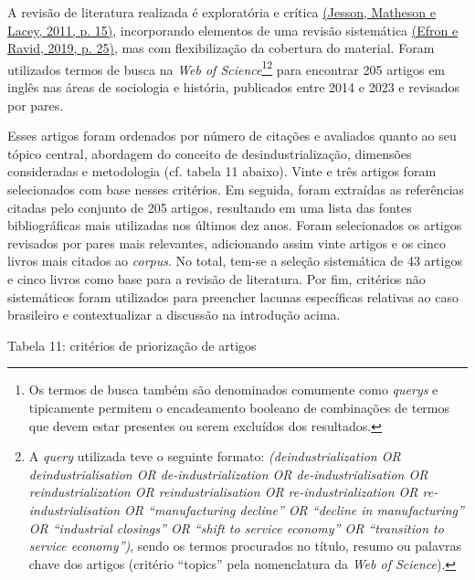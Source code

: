 A revisão de literatura realizada é exploratória e crítica
\href{https://www.zotero.org/google-docs/?2AtMYd}{(Jesson, Matheson e
Lacey, 2011, p. 15)}, incorporando elementos de uma revisão sistemática
\href{https://www.zotero.org/google-docs/?WshOkn}{(Efron e Ravid, 2019,
p. 25)}, mas com flexibilização da cobertura do material. Foram
utilizados termos de busca na \emph{Web of
Science}\footnote{Os termos de busca também são denominados comumente
  como \emph{querys} e tipicamente permitem o encadeamento booleano de
  combinações de termos que devem estar presentes ou serem excluídos dos
  resultados.}\footnote{A \emph{query} utilizada teve o seguinte
  formato: \emph{(deindustrialization OR deindustrialisation OR
  de-industrialization OR de-industrialisation OR reindustrialization OR
  reindustrialisation OR re-industrialization OR re-industrialisation OR
  ``manufacturing decline'' OR ``decline in manufacturing'' OR
  ``industrial closings'' OR ``shift to service economy'' OR
  ``transition to service economy'')}, sendo os termos procurados no
  título, resumo ou palavras chave dos artigos (critério ``topics'' pela
  nomenclatura da \emph{Web of Science}).} para encontrar 205 artigos em
inglês nas áreas de sociologia e história, publicados entre 2014 e 2023
e revisados por pares.

Esses artigos foram ordenados por número de citações e avaliados quanto
ao seu tópico central, abordagem do conceito de desindustrialização,
dimensões consideradas e metodologia (cf. tabela 11 abaixo). Vinte e
três artigos foram selecionados com base nesses critérios. Em seguida,
foram extraídas as referências citadas pelo conjunto de 205 artigos,
resultando em uma lista das fontes bibliográficas mais utilizadas nos
últimos dez anos. Foram selecionados os artigos revisados por pares mais
relevantes, adicionando assim vinte artigos e os cinco livros mais
citados ao \emph{corpus}. No total, tem-se a seleção sistemática de 43
artigos e cinco livros como base para a revisão de literatura. Por fim,
critérios não sistemáticos foram utilizados para preencher lacunas
específicas relativas ao caso brasileiro e contextualizar a discussão na
introdução acima.

Tabela 11: critérios de priorização de artigos

